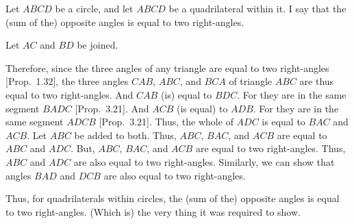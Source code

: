 \begin{Parallel}{}{}
{\epsfysize=2.2in
\centerline{}

Let $ABCD$ be a circle, and let $ABCD$ be a quadrilateral within it. I say that
the (sum of the) opposite angles is equal to two right-angles.

Let $AC$ and $BD$ be joined.

Therefore, since the three angles of any triangle are equal to two
right-angles [Prop.~1.32], the
three angles $CAB$, $ABC$, and $BCA$ of triangle $ABC$ are thus equal to two right-angles. And $CAB$ (is) equal to $BDC$. For they are in the
same segment $BADC$ [Prop.~3.21]. And $ACB$ (is equal) to $ADB$.
For they are in the same segment $ADCB$ [Prop.~3.21].
Thus, the whole of $ADC$ is equal to $BAC$ and $ACB$. Let $ABC$ be added to both. Thus, $ABC$, $BAC$, and
$ACB$ are equal to $ABC$ and $ADC$. But, $ABC$, $BAC$, and $ACB$ are equal to
two right-angles. Thus, $ABC$ and $ADC$ are also equal to two right-angles.
Similarly, we can show that angles $BAD$ and $DCB$ are also equal to
two right-angles.

Thus, for quadrilaterals within circles, the (sum of the) opposite angles is equal to two right-angles. (Which is) the very thing it was required to show.}
\end{Parallel}

